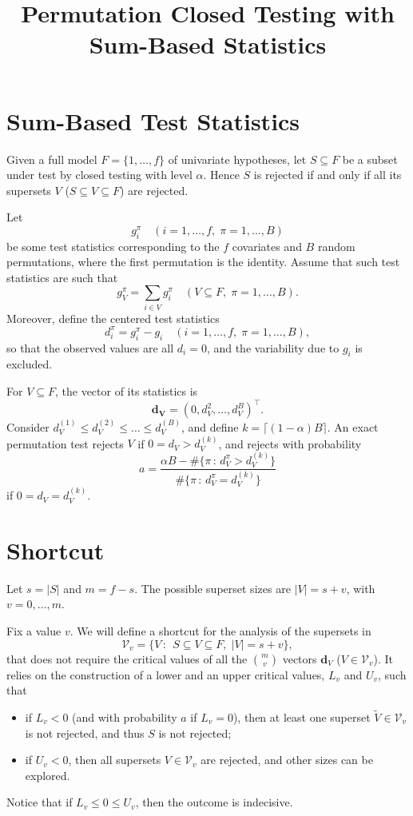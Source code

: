 \documentclass[11pt,a4paper,openright,twoside]{article}
\title{Permutation Closed Testing with Sum-Based Statistics}
\author{}
\date{}
\begin{document}
\maketitle


\section{Sum-Based Test Statistics}
Given a full model $F=\{1,\ldots, f\}$ of univariate hypotheses, let $S\subseteq F$ be a subset under test by closed testing with level $\alpha$. Hence $S$ is rejected if and only if all its supersets $V$ ($S\subseteq V\subseteq F$) are rejected.

Let
\[g_i^\pi\quad (i=1,\ldots,f,\; \pi=1,\ldots,B)\]
be some test statistics corresponding to the $f$ covariates and $B$ random permutations, where the first permutation is the identity. Assume that such test statistics are such that
\[g_V^\pi=\sum_{i\in V}g_i^\pi\quad (V\subseteq F,\;\pi=1,\ldots,B).\]
Moreover, define the centered test statistics
\[d_i^\pi = g_i^\pi - g_i \quad (i=1,\ldots,f,\; \pi=1,\ldots,B),\]
so that the observed values are all $d_i=0$, and the variability due to $g_i$ is excluded.

For $V\subseteq F$, the vector of its statistics is
\[\mathbf{d_V}=(0,d_V^2,\ldots,d_V^B)^\top.\]
Consider $d_V^{(1)}\leq d_V^{(2)}\leq\ldots\leq d_V^{(B)}$, and define $k=\lceil (1-\alpha) B\rceil$. An exact permutation test rejects $V$ if $0=d_V>d_V^{(k)}$, and rejects with probability
\[a=\frac{\alpha B - \#\{\pi\,:\,d_V^\pi>d_V^{(k)}\}}{\#\{\pi\,:\,d_V^\pi=d_V^{(k)}\}}\]
if $0=d_V=d_V^{(k)}$.






\vspace{10mm}

\section{Shortcut}
Let $s=|S|$ and $m=f-s$. The possible superset sizes are $|V|=s+v$, with $v=0,\ldots,m$.

Fix a value $v$. We will define a shortcut for the analysis of the supersets in
\[\mathcal{V}_v=\{V\,:\,\;S\subseteq V\subseteq F,\; |V|=s+v\},\]
that does not require the critical values of all the $\binom{m}{v}$ vectors $\mathbf{d}_V$ ($V\in\mathcal{V}_v$). It relies on the construction of a lower and an upper critical values, $L_v$ and $U_v$, such that
\begin{itemize}
\item if $L_v< 0$ (and with probability $a$ if $L_v=0$), then at least one superset $\tilde{V}\in\mathcal{V}_v$ is not rejected, and thus $S$ is not rejected;
\item if $U_v<0$, then all supersets $V\in\mathcal{V}_v$ are rejected, and other sizes can be explored.
\end{itemize}
Notice that if $L_v\leq 0\leq U_v$, then the outcome is indecisive. 
\end{document}
